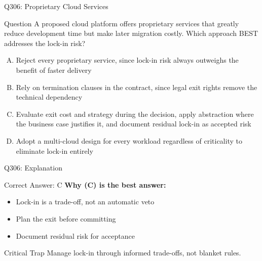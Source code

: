 \documentclass{beamer}
\begin{document}
	\begin{frame}{Q306: Proprietary Cloud Services}
		\begin{block}{Question}
			\small A proposed cloud platform offers proprietary services that greatly reduce development time but make later migration costly. Which approach BEST addresses the lock-in risk?
		\end{block}
		\begin{enumerate}[(A)]
			\footnotesize
			\item Reject every proprietary service, since lock-in risk always outweighs the benefit of faster delivery
			\item Rely on termination clauses in the contract, since legal exit rights remove the technical dependency
			\item Evaluate exit cost and strategy during the decision, apply abstraction where the business case justifies it, and document residual lock-in as accepted risk
			\item Adopt a multi-cloud design for every workload regardless of criticality to eliminate lock-in entirely
		\end{enumerate}
	\end{frame}
	
	\begin{frame}{Q306: Explanation}
		\begin{block}{Correct Answer: C}
			\textbf{Why (C) is the best answer:}
			\begin{itemize}
				\item Lock-in is a trade-off, not an automatic veto
				\item Plan the exit before committing
				\item Document residual risk for acceptance
			\end{itemize}
		\end{block}
		\begin{alertblock}{Critical Trap}
			Manage lock-in through informed trade-offs, not blanket rules.
		\end{alertblock}
	\end{frame}
	
\end{document}
